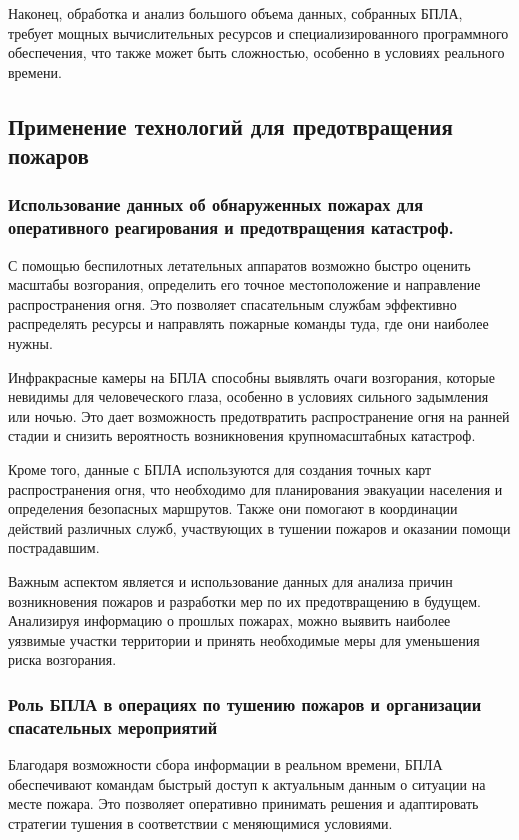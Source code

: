 Наконец, обработка и анализ большого объема данных, собранных БПЛА, требует мощных вычислительных ресурсов и специализированного программного обеспечения, что также может быть сложностью, особенно в условиях реального времени.
\subsection{Применение технологий для предотвращения пожаров}
\subsubsection{Использование данных об обнаруженных пожарах для оперативного реагирования и предотвращения катастроф.}
С помощью беспилотных летательных аппаратов возможно быстро оценить масштабы возгорания, определить его точное местоположение и направление распространения огня. Это позволяет спасательным службам эффективно распределять ресурсы и направлять пожарные команды туда, где они наиболее нужны.

Инфракрасные камеры на БПЛА способны выявлять очаги возгорания, которые невидимы для человеческого глаза, особенно в условиях сильного задымления или ночью. Это дает возможность предотвратить распространение огня на ранней стадии и снизить вероятность возникновения крупномасштабных катастроф.

Кроме того, данные с БПЛА используются для создания точных карт распространения огня, что необходимо для планирования эвакуации населения и определения безопасных маршрутов. Также они помогают в координации действий различных служб, участвующих в тушении пожаров и оказании помощи пострадавшим.

Важным аспектом является и использование данных для анализа причин возникновения пожаров и разработки мер по их предотвращению в будущем. Анализируя информацию о прошлых пожарах, можно выявить наиболее уязвимые участки территории и принять необходимые меры для уменьшения риска возгорания.
\subsubsection{Роль БПЛА в операциях по тушению пожаров и организации спасательных мероприятий}
Благодаря возможности сбора информации в реальном времени, БПЛА обеспечивают командам быстрый доступ к актуальным данным о ситуации на месте пожара. Это позволяет оперативно принимать решения и адаптировать стратегии тушения в соответствии с меняющимися условиями.

